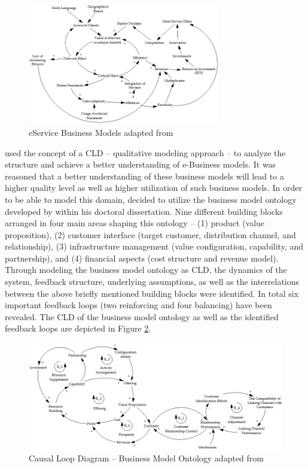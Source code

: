 \begin{figure}[tb]
	\centering
	\includegraphics[width=0.75\textwidth]{gfx/cld_klueber}
	\caption[eService Business Models]{eService Business Models adapted from \citet[p. 798]{Klueber2000}}
	\label{fig:cld_kl}
\end{figure}

\citet{Kiani2009} used the concept of a \ac{CLD} -- qualitative modeling approach -- to analyze the structure and achieve a better understanding of e-Business models. It was reasoned that a better understanding of these business models will lead to a higher quality level as well as higher utilization of such business models. In order to be able to model this domain, \citet{Kiani2009} decided to utilize the business model ontology developed by \citet{Osterwalder2004} within his doctoral dissertation. Nine different building blocks arranged in four main areas shaping this ontology -- (1) product (value proposition), (2) customer interface (target customer, distribution channel, and relationship), (3) infrastructure management (value configuration, capability, and partnership), and (4) financial aspects (cost structure and revenue model). Through modeling the business model ontology as \ac{CLD}, the dynamics of the system, feedback structure, underlying assumptions, as well as the interrelations between the above briefly mentioned building blocks were identified. In total six important feedback loops (two reinforcing and four balancing) have been revealed. The \ac{CLD} of the business model ontology as well as the identified feedback loops are depicted in Figure \ref{fig:cld_ki}.

\begin{figure}[t]
	\centering
	\includegraphics[width=\textwidth]{gfx/cld_kiani}
	\caption[Causal Loop Diagram -- Business Model Ontology]{Causal Loop Diagram -- Business Model Ontology adapted from \citet[p. 164]{Kiani2009}}
	\label{fig:cld_ki}
\end{figure}

